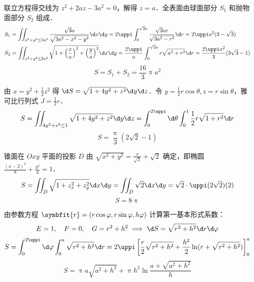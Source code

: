 \begin{solution}
    联立方程得交线为 $z^2 + 2az - 3a^2 = 0$，解得 $z=a$．全表面由球面部分 $S_1$ 和抛物面部分 $S_2$ 组成．
    \begin{equation}
        \begin{aligned}
            S_1 & = \iint_{x^2+y^2 \le 2a^2} \frac{\sqrt{3}a}{\sqrt{3a^2-x^2-y^2}} \d x \d y = 2\uppi \int_0^{\sqrt{2}a} \frac{\sqrt{3}ar}{\sqrt{3a^2-r^2}} \d r = 2\uppi a^2 (3-\sqrt{3})                                    \\
            S_2 & = \iint_{x^2+y^2 \le 2a^2} \sqrt{1 + \left( \frac{x}{a} \right)^2 + \left( \frac{y}{a} \right)^2} \d x \d y = \frac{2\uppi}{a} \int_0^{\sqrt{2}a} r \sqrt{a^2+r^2} \d r = \frac{2\uppi a^2}{3}(3\sqrt{3}-1)
        \end{aligned}
    \end{equation}
    \begin{equation}
        \boxed{S = S_1 + S_2 = \frac{16}{3} \uppi a^2}
    \end{equation}


    由 $x = y^2 + \frac{1}{2}z^2$ 得 $\d S = \sqrt{1 + 4y^2 + z^2} \d y \d z$．令 $y = \frac{1}{2}r \cos \theta, z = r \sin \theta$，雅可比行列式 $J = \frac{1}{2}r$．
    \begin{equation}
        S = \iint_{4y^2+z^2 \le 1} \sqrt{1+4y^2+z^2} \d y \d z = \int_0^{2\uppi} \d \theta \int_0^1 \frac{1}{2}r \sqrt{1+r^2} \d r
    \end{equation}
    \begin{equation}
        \boxed{S = \frac{\uppi}{3}(2\sqrt{2}-1)}
    \end{equation}


    锥面在 $Oxy$ 平面的投影 $D$ 由 $\sqrt{x^2+y^2} = \frac{x}{\sqrt{2}} + \sqrt{2}$ 确定，即椭圆 $\frac{(x-2)^2}{8} + \frac{y^2}{4} = 1$．
    \begin{equation}
        S = \iint_D \sqrt{1+z_x^2+z_y^2} \d x \d y = \iint_D \sqrt{2} \d x \d y = \sqrt{2} \cdot \uppi(2\sqrt{2})(2)
    \end{equation}
    \begin{equation}
        \boxed{S = 8\uppi}
    \end{equation}


    由参数方程 $\symbfit{r} = (r \cos \varphi, r \sin \varphi, h \varphi)$ 计算第一基本形式系数：
    \begin{equation}
        E = 1, \quad F = 0, \quad G = r^2 + h^2 \implies \d S = \sqrt{r^2 + h^2} \d r \d \varphi
    \end{equation}
    \begin{equation}
        S = \int_0^{2\uppi} \d \varphi \int_0^a \sqrt{r^2+h^2} \d r = 2\uppi \left[ \frac{r}{2}\sqrt{r^2+h^2} + \frac{h^2}{2} \ln (r + \sqrt{r^2+h^2}) \right]_0^a
    \end{equation}
    \begin{equation}
        \boxed{S = \uppi a \sqrt{a^2+h^2} + \uppi h^2 \ln \frac{a + \sqrt{a^2+h^2}}{h}}
    \end{equation}


\end{solution}
